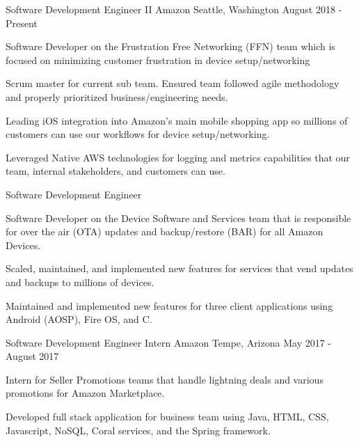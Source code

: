 \documentclass[
    changecolor={96, 52, 177},
]{peter-resume}
\begin{document}
\pagestyle{empty} %

\cventry
  {Software Development Engineer II}
  {Amazon}
  {Seattle, Washington}
  {August 2018 - Present}
  {
    \begin{cvitems}
      \item {Software Developer on the Frustration Free Networking (FFN) team which is focused on minimizing customer frustration in device setup/networking}
      \item {Scrum master for current sub team. Ensured team followed agile methodology and properly prioritized business/engineering needs.}
      \item {Leading iOS integration into Amazon's main mobile shopping app so millions of customers can use our workflows for device setup/networking.}
      \item {Leveraged Native AWS technologies for logging and metrics capabilities that our team, internal stakeholders, and customers can use.}
    \end{cvitems}
  }
\cventry
  {Software Development Engineer}
  {}
  {}
  {}
  {
    \begin{cvitems}
      \item {Software Developer on the Device Software and Services team that is responsible for over the air (OTA) updates and backup/restore (BAR) for all Amazon Devices.}
      \item {Scaled, maintained, and implemented new features for services that vend updates and backups to millions of devices.}
      \item {Maintained and implemented new features for three client applications using Android (AOSP), Fire OS, and C.}
    \end{cvitems}
  }
\cventry
  {Software Development Engineer Intern}
  {Amazon}
  {Tempe, Arizona}
  {May 2017 - August 2017}
  {
    \begin{cvitems}
      \item {Intern for Seller Promotions teams that handle lightning deals and various promotions for Amazon Marketplace.}
      \item {Developed full stack application for business team using Java, HTML, CSS, Javascript, NoSQL, Coral services, and the Spring framework.}
    \end{cvitems}
  }
\end{document}
